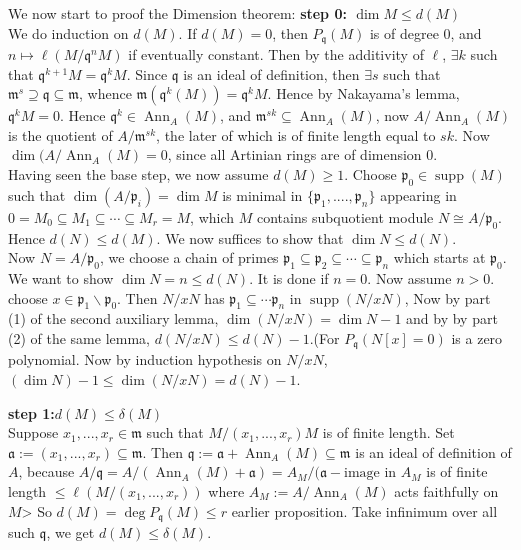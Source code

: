 \documentclass[12pt]{article}
\theoremstyle{definition}
\theoremstyle{plain}
\DeclareMathOperator{\Ann}{Ann}
\DeclareMathOperator{\supp}{supp}
\begin{document}
\medskip
We now start to proof the Dimension theorem:
\leavevmode\newline
\textbf{step 0: $\dim M\leq d(M)$}\\
\indent We do induction on $d(M)$. If $d(M)=0$, then $P_\mathfrak{q}(M)$ is of degree $0$, and $n\mapsto \ell(M/\mathfrak{q}^nM)$ if eventually constant. Then by the additivity of $\ell$, $\exists k$ such that $\mathfrak{q}^{k+1}M=\mathfrak{q}^kM$. Since $\mathfrak{q}$ is an ideal of definition, then $\exists s$ such that $\mathfrak{m}^s\supseteq \mathfrak{q}\subseteq \mathfrak{m}$, whence $\mathfrak{m}(\mathfrak{q}^k(M))=\mathfrak{q}^kM$. Hence by Nakayama's lemma, $\mathfrak{q}^kM=0$. Hence $\mathfrak{q}^k\in \Ann_A(M)$, and $\mathfrak{m}^{sk}\subseteq \Ann_A(M)$, now $A/\Ann_A(M)$ is the quotient of $A/\mathfrak{m}^{sk}$, the later of which is of finite length equal to $sk$. Now $\dim(A/\Ann_A(M)=0$, since all Artinian rings are of dimension $0$.\\
\indent Having seen the base step, we now assume $d(M)\geq 1$. Choose $\mathfrak{p}_0\in \supp(M)$ such that $\dim(A/\mathfrak{p}_i)=\dim M$ is minimal in $\{\mathfrak{p}_1, ...., \mathfrak{p}_n\}$ appearing in $0=M_0\subseteq M_1\subseteq \cdots\subseteq M_r=M$, which $M$ contains subquotient module $N\cong A/\mathfrak{p}_0$. Hence $d(N)\leq d(M)$. We now suffices to show that $\dim N\leq d(N)$.\\
\indent Now $N=A/\mathfrak{p}_0$, we choose a chain of primes $\mathfrak{p}_1\subseteq \mathfrak{p}_2\subseteq\cdots\subseteq \mathfrak{p}_n$ which starts at $\mathfrak{p}_0$. We want to show $\dim N=n\leq d(N)$. It is done if $n=0$. Now assume $n>0$. choose $x\in \mathfrak{p}_1\backslash \mathfrak{p}_0$. Then $N/xN$ has $\mathfrak{p}_1\subseteq \cdots \mathfrak{p}_n$ in $\supp(N/xN)$, Now by part (1) of the second auxiliary lemma, $\dim(N/xN)=\dim N-1$ and by by part (2) of the same lemma, $d(N/xN)\leq d(N)-1$.(For $P_\mathfrak{q}(N[x]=0)$ is a zero polynomial. Now by induction hypothesis on $N/xN$, $(\dim N)-1\leq \dim(N/xN)=d(N)-1$.

\medskip
\textbf{step 1:$d(M)\leq \delta(M)$}\\
\indent Suppose $x_1, ..., x_r\in \mathfrak{m}$ such that $M/(x_1, ..., x_r)M$ is of finite length. Set $\mathfrak{a}:=(x_1, ..., x_r)\subseteq \mathfrak{m}$. Then $\mathfrak{q}:=\mathfrak{a}+\Ann_A(M)\subseteq \mathfrak{m}$ is an ideal of definition of $A$, because $A/\mathfrak{q}=A/(\Ann_A(M)+\mathfrak{a})=A_M/(\mathfrak{a}-\text{image in }A_M$ is of finite length $\leq \ell(M/(x_1, ..., x_r))$ where $A_M:=A/\Ann_A(M)$ acts faithfully on $M$> So $d(M)=\deg P_\mathfrak{q}(M)\leq r$ earlier proposition. Take infinimum over all such $\mathfrak{q}$, we get $d(M)\leq \delta(M)$.
\end{document}
